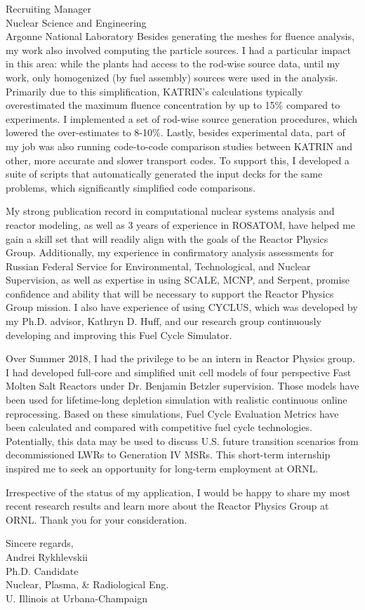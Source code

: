 \documentclass[11pt]{letter} %
\newcommand{\RecipientName}{Recruiting Manager\xspace}
\newcommand{\RecipientAddress}{Nuclear Science and Engineering \\
Argonne National Laboratory}
\begin{document}
\begin{letter}{\RecipientName\\
        \RecipientAddress\xspace}
Besides generating the meshes for fluence analysis, my work also involved 
computing the particle sources. I had a particular impact in this area: while 
the plants had access to the rod-wise source data, until my work, only 
homogenized (by fuel assembly) sources were used in the analysis. Primarily 
due to this simplification, KATRIN’s calculations typically overestimated the 
maximum fluence concentration by up to 15\% compared to experiments. I 
implemented a set of rod-wise source generation procedures, which lowered the 
over-estimates to 8-10\%. Lastly, besides experimental data, part of my job 
was also running code-to-code comparison studies between KATRIN and other, 
more accurate and slower transport codes. To support this, I developed a suite 
of scripts that automatically generated the input decks for the same problems, 
which significantly simplified code comparisons. 

My strong publication record in computational nuclear systems analysis and 
reactor modeling, as well as 3 years of experience in ROSATOM, have helped me 
gain a skill set that will readily align with the goals of the Reactor Physics 
Group. Additionally, my experience in confirmatory analysis assessments for 
Russian Federal Service for Environmental, Technological, and Nuclear 
Supervision, as well as expertise in using SCALE, MCNP, and Serpent, promise 
confidence and ability that will be necessary to support the Reactor Physics 
Group mission. I also have experience of using CYCLUS, which was developed by 
my Ph.D. advisor, Kathryn D. Huff, and our research group continuously 
developing and improving this Fuel Cycle Simulator.

Over Summer 2018, I had the privilege to be an intern in Reactor Physics 
group. I had developed full-core and simplified unit cell models of four 
perspective Fast Molten Salt Reactors under Dr. Benjamin Betzler supervision. 
Those models have been used for lifetime-long depletion simulation with 
realistic continuous online reprocessing. Based on these simulations, Fuel 
Cycle Evaluation Metrics have been calculated and compared with competitive 
fuel cycle technologies. Potentially, this data may be used to discuss U.S. 
future transition scenarios from decommissioned LWRs to Generation IV MSRs. 
This short-term internship inspired me to seek an opportunity for long-term 
employment at ORNL.

Irrespective of the status of my application, I would be happy to share my 
most recent research results and learn more about the Reactor Physics Group at 
ORNL. Thank you for your consideration.

\closing{Sincere regards,\\
{Andrei Rykhlevskii\\
Ph.D. Candidate\\
Nuclear, Plasma, \& Radiological Eng.\\
U. Illinois at Urbana-Champaign}
}


\end{letter}
\end{document}
